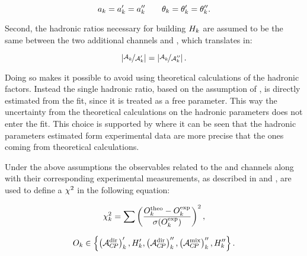 \begin{equation}
a_k= a_k' = a_k'' \qquad \theta_k = \theta_k' = \theta_k''.
\label{su3_apply}
\end{equation}

\noindent Second, the hadronic ratios necessary for building $H_{k}$ are assumed to be the same between
the two additional channels \BsJpsiKst and \BdJpsiRho, which translates in:

\begin{equation}
  \centering
  \hadRatio{k}{}{\prime} =
  \hadRatio{k}{}{\prime\prime}.
    \label{had_ratios_assuption}
\end{equation}

\noindent Doing so makes it possible to avoid using theoretical calculations of the hadronic factors.
Instead the single hadronic ratio, based on the assumption of , is directly
estimated from the fit, since it is treated as a free parameter. This way the uncertainty from the theoretical
calculations on the hadronic parameters does not enter the fit. This choice is supported by \cite{DeBruyn:2014oga,DeBruyn-thesis}
where it can be seen that the hadronic parameters estimated form experimental data are more precise
that the ones coming from theoretical calculations.

Under the above assumptions the observables related to the \BsJpsiKst and \BdJpsiRho channels along
with their corresponding experimental measurements, as described in  and
, are used to define a $\chi^2$ in the following equation:

\begin{equation}
  \centering
  \chisq_k = \sum \left(\frac{O^{\rm theo}_k - O^{\rm exp}_k} {\sigma(O^{\rm exp}_k)}\right)^2,
  \label{chisq_form}
\end{equation}


\begin{equation}
  \centering
  O_k \in \left\{ \parenthesis{\Acp{\rm dir}}'_k, \Hobs{k}', \parenthesis{\Acp{\rm dir}}''_k, \parenthesis{\Acp{\rm mix}}''_k, \Hobs{k}'' \right\}.
  \label{chisq_form_with}
\end{equation}

